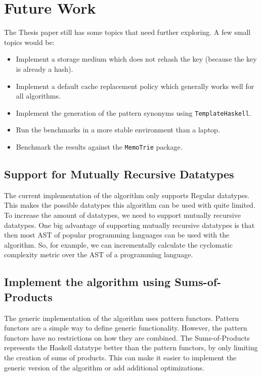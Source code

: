\section{Future Work}


The Thesis paper still has some topics that need further exploring. A few small topics would be: 
\begin{itemize}
  \item Implement a storage medium which does not rehash the key (because the key is already a hash).
  \item Implement a default cache replacement policy which generally works well for all algorithms. 
  \item Implement the generation of the pattern synonyms using \texttt{TemplateHaskell}.
  \item Run the benchmarks in a more stable environment than a laptop.
  \item Benchmark the results against the \texttt{MemoTrie} package.
\end{itemize}

\subsection{Support for Mutually Recursive Datatypes}
The current implementation of the algorithm only supports Regular datatypes. This makes the possible datatypes this algorithm can be used with quite limited. To increase the amount of datatypes, we need to support mutually recursive datatypes. One big advantage of supporting mutually recursive datatypes is that then most AST of popular programming languages can be used with the algorithm. So, for example, we can incrementally calculate the cyclomatic complexity metric over the AST of a programming language.

\subsection{Implement the algorithm using Sums-of-Products}
The generic implementation of the algorithm uses pattern functors. Pattern functors are a simple way to define generic functionality. However, the pattern functors have no restrictions on how they are combined. The Sums-of-Products represents the Haskell datatype better than the pattern functors, by only limiting the creation of sums of products. This can make it easier to implement the generic version of the algorithm or add additional optimizations.


